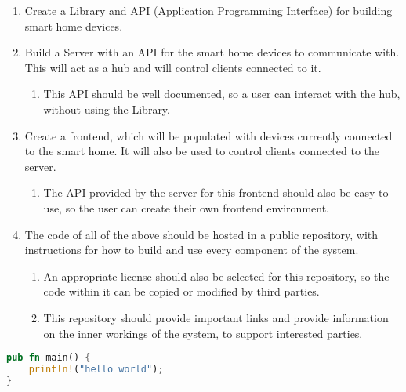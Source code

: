 \begin{enumerate}
    \item Create a Library and API (Application Programming Interface) for 
        building smart home devices.
    \item Build a Server with an API for the smart home devices to communicate 
        with. This will act as a hub and will control clients connected to it.
         \begin{enumerate}
             \item This API should be well documented, so a user can interact 
                 with the hub, without using the Library.
         \end{enumerate}
     \item Create a frontend, which will be populated with devices currently 
         connected to the smart home. It will also be used to control clients 
         connected to the server.
         \begin{enumerate}
             \item The API provided by the server for this frontend should also 
                 be easy to use, so the user can create their own frontend 
                 environment.
         \end{enumerate}
     \item The code of all of the above should be hosted in a public repository, 
         with instructions for how to build and use every component of the 
         system.
         \begin{enumerate}
             \item An appropriate license should also be selected for this 
                 repository, so the code within it can be copied or modified by 
                 third parties.
             \item This repository should provide important links and provide 
                 information on the inner workings of the system, to support 
                 interested parties.
         \end{enumerate}
\end{enumerate}
    

\begin{lstlisting}[language=Rust, style=colouredRust, caption=Rust Example]
pub fn main() {
    println!("hello world");
}
\end{lstlisting}
